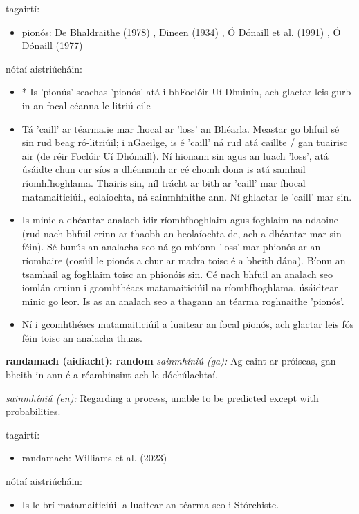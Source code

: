 \documentclass{article}
\begin{document}
tagairtí:
\begin{itemize}
	\item pionós: De Bhaldraithe (1978) \cite{de-bhaldraithe}, Dineen (1934) \cite{dineen}, Ó Dónaill et al. (1991) \cite{focloir-beag}, Ó Dónaill (1977) \cite{odonaill}
\end{itemize}

nótaí aistriúcháin:
\begin{itemize}
	\item * Is 'pionús' seachas 'pionós' atá i bhFoclóir Uí Dhuinín, ach glactar leis gurb in an focal céanna le litriú eile
	\item Tá 'caill' ar téarma.ie mar fhocal ar 'loss' an Bhéarla. Meastar go bhfuil sé sin rud beag ró-litriúil; i nGaeilge, is é 'caill' ná rud atá caillte / gan tuairisc air (de réir Foclóir Uí Dhónaill). Ní hionann sin agus an luach 'loss', atá úsáidte chun cur síos a dhéanamh ar cé chomh dona is atá samhail ríomhfhoghlama. Thairis sin, níl trácht ar bith ar 'caill' mar fhocal matamaiticiúil, eolaíochta, ná sainmhínithe ann. Ní ghlactar le 'caill' mar sin.
	\item Is minic a dhéantar analach idir ríomhfhoghlaim agus foghlaim na ndaoine (rud nach bhfuil crinn ar thaobh an heolaíochta de, ach a dhéantar mar sin féin). Sé bunús an analacha seo ná go mbíonn 'loss' mar phionós ar an ríomhaire (cosúil le pionós a chur ar madra toisc é a bheith dána). Bíonn an tsamhail ag foghlaim toisc an phionóis sin. Cé nach bhfuil an analach seo iomlán cruinn i gcomhthéacs matamaiticiúil na ríomhfhoghlama, úsáidtear minic go leor. Is as an analach seo a thagann an téarma roghnaithe 'pionós'.
	\item Ní i gcomhthéacs matamaiticiúil a luaitear an focal pionós, ach glactar leis fós féin toisc an analacha thuas.
\end{itemize}


\textbf{randamach (aidiacht): random}
\textit{sainmhíniú (ga):} Ag caint ar próiseas, gan bheith in ann é a réamhinsint ach le dóchúlachtaí.

\textit{sainmhíniú (en):} Regarding a process, unable to be predicted except with probabilities.

tagairtí:
\begin{itemize}
	\item randamach: Williams et al. (2023) \cite{storchiste}
\end{itemize}

nótaí aistriúcháin:
\begin{itemize}
	\item Is le brí matamaiticiúil a luaitear an téarma seo i Stórchiste.
\end{itemize}
\end{document}
